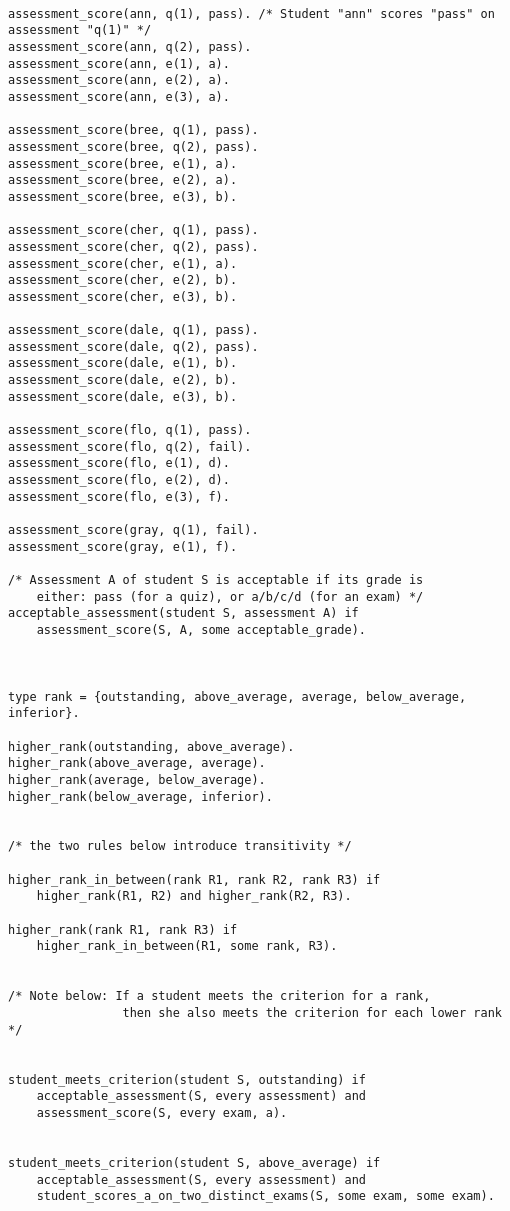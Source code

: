 \documentclass[letterpaper,10pt]{article}
\begin{document}
\begin{flushleft}
\begin{verbatim}
        
assessment_score(ann, q(1), pass). /* Student "ann" scores "pass" on assessment "q(1)" */
assessment_score(ann, q(2), pass). 
assessment_score(ann, e(1), a). 
assessment_score(ann, e(2), a). 
assessment_score(ann, e(3), a). 

assessment_score(bree, q(1), pass). 
assessment_score(bree, q(2), pass). 
assessment_score(bree, e(1), a). 
assessment_score(bree, e(2), a).
assessment_score(bree, e(3), b). 

assessment_score(cher, q(1), pass). 
assessment_score(cher, q(2), pass). 
assessment_score(cher, e(1), a). 
assessment_score(cher, e(2), b). 
assessment_score(cher, e(3), b).

assessment_score(dale, q(1), pass). 
assessment_score(dale, q(2), pass). 
assessment_score(dale, e(1), b). 
assessment_score(dale, e(2), b).
assessment_score(dale, e(3), b).

assessment_score(flo, q(1), pass). 
assessment_score(flo, q(2), fail). 
assessment_score(flo, e(1), d). 
assessment_score(flo, e(2), d).
assessment_score(flo, e(3), f). 

assessment_score(gray, q(1), fail).
assessment_score(gray, e(1), f).

/* Assessment A of student S is acceptable if its grade is 
    either: pass (for a quiz), or a/b/c/d (for an exam) */    
acceptable_assessment(student S, assessment A) if
    assessment_score(S, A, some acceptable_grade).

    
    
type rank = {outstanding, above_average, average, below_average, inferior}.

higher_rank(outstanding, above_average).
higher_rank(above_average, average).
higher_rank(average, below_average).
higher_rank(below_average, inferior).


/* the two rules below introduce transitivity */

higher_rank_in_between(rank R1, rank R2, rank R3) if
    higher_rank(R1, R2) and higher_rank(R2, R3).   

higher_rank(rank R1, rank R3) if
    higher_rank_in_between(R1, some rank, R3).


/* Note below: If a student meets the criterion for a rank, 
                then she also meets the criterion for each lower rank */
    
    
student_meets_criterion(student S, outstanding) if
    acceptable_assessment(S, every assessment) and
    assessment_score(S, every exam, a).

    
student_meets_criterion(student S, above_average) if
    acceptable_assessment(S, every assessment) and
    student_scores_a_on_two_distinct_exams(S, some exam, some exam).
    

\end{verbatim}
\end{flushleft}
\end{document}
